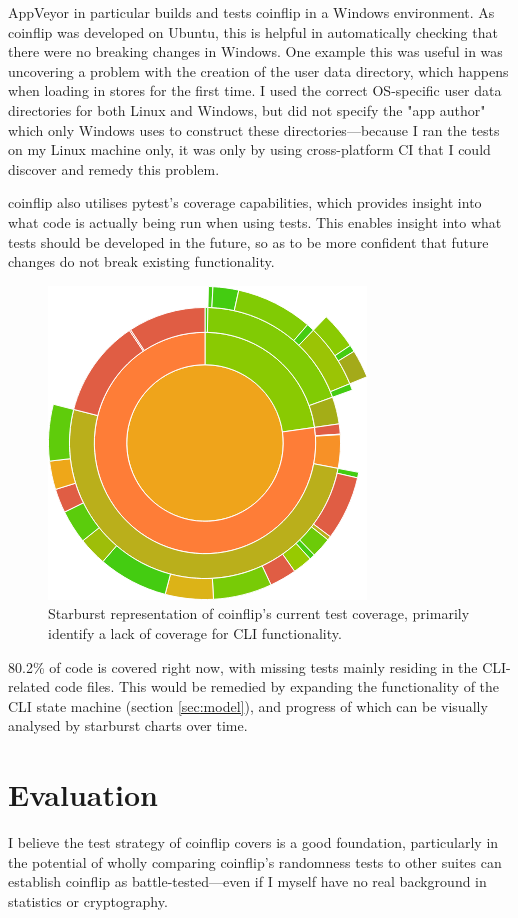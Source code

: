 \documentclass[11pt]{article}
\begin{document}
AppVeyor in particular builds and tests coinflip in a Windows environment. As coinflip was developed on Ubuntu, this is helpful in automatically checking that there were no breaking changes in Windows. One example this was useful in was uncovering a problem with the creation of the user data directory, which happens when loading in stores for the first time. I used the correct OS-specific user data directories for both Linux and Windows, but did not specify the "app author" which only Windows uses to construct these directories---because I ran the tests on my Linux machine only, it was only by using cross-platform CI that I could discover and remedy this problem.

coinflip also utilises pytest's coverage capabilities, which provides insight into what code is actually being run when using tests. This enables insight into what tests should be developed in the future, so as to be more confident that future changes do not break existing functionality.

\begin{figure}[htbp]
  \centering
  \includegraphics[width=.5\linewidth]{./starburst.png}
  \caption{Starburst representation of coinflip's current test coverage, primarily identify a lack of coverage for CLI functionality.}
\end{figure}

80.2\% of code is covered right now, with missing tests mainly residing in the CLI-related code files. This would be remedied by expanding the functionality of the CLI state machine (section \ref{sec:model}), and progress of which can be visually analysed by starburst charts over time.

\section{Evaluation}
\label{sec:orga7452af}
I believe the test strategy of coinflip covers is a good foundation, particularly in the potential of wholly comparing coinflip's randomness tests to other suites can establish coinflip as battle-tested---even if I myself have no real background in statistics or cryptography.
\end{document}
